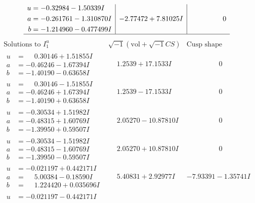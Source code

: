 \documentclass[1p]{elsarticle_modified}
\theoremstyle{definition}
\newcommand{\I}{\sqrt{-1}}
\begin{document}
$$\begin{array}{c|c|c}
\begin{aligned}
u &= -0.32984 - 1.50339 I \\
a &= -0.261761 - 1.310870 I \\
b &= -1.214960 - 0.477499 I\end{aligned}
 & -2.77472 + 7.81025 I & \phantom{-0.000000 } 0\\
 \hline 
 \end{array}$$\newpage$$\begin{array}{c|c|c}  
\text{Solutions to }I^u_{1}& \I (\text{vol} + \sqrt{-1}CS) & \text{Cusp shape}\\
 \hline 
\begin{aligned}
u &= \phantom{-}0.30146 + 1.51855 I \\
a &= -0.46246 - 1.67394 I \\
b &= -1.40190 - 0.63658 I\end{aligned}
 & \phantom{-}1.2539 + 17.1533 I & \phantom{-0.000000 } 0 \\ \hline\begin{aligned}
u &= \phantom{-}0.30146 - 1.51855 I \\
a &= -0.46246 + 1.67394 I \\
b &= -1.40190 + 0.63658 I\end{aligned}
 & \phantom{-}1.2539 - 17.1533 I & \phantom{-0.000000 } 0 \\ \hline\begin{aligned}
u &= -0.30534 + 1.51982 I \\
a &= -0.48315 + 1.60769 I \\
b &= -1.39950 + 0.59507 I\end{aligned}
 & \phantom{-}2.05270 - 10.87810 I & \phantom{-0.000000 } 0 \\ \hline\begin{aligned}
u &= -0.30534 - 1.51982 I \\
a &= -0.48315 - 1.60769 I \\
b &= -1.39950 - 0.59507 I\end{aligned}
 & \phantom{-}2.05270 + 10.87810 I & \phantom{-0.000000 } 0 \\ \hline\begin{aligned}
u &= -0.021197 + 0.442171 I \\
a &= \phantom{-}5.00384 - 0.18590 I \\
b &= \phantom{-}1.224420 + 0.035696 I\end{aligned}
 & \phantom{-}5.40831 + 2.92977 I & -7.93391 - 1.35741 I \\ \hline\begin{aligned}
u &= -0.021197 - 0.442171 I \\

\end{aligned}
\end{array}$$
\end{document}
